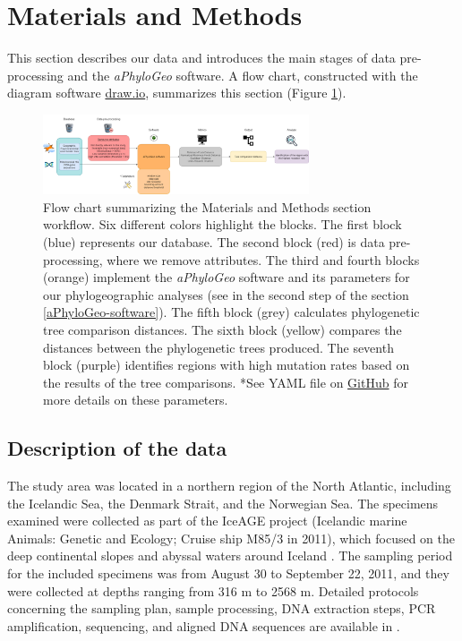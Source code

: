 \section{Materials and Methods}\label{materials-methods}
This section describes our data and introduces the main stages of data pre-processing and the \textit{aPhyloGeo} software. A flow chart, constructed with the diagram software \href{https://app.diagrams.net/}{draw.io}, summarizes this section (Figure \ref{fig:fig1}).

\begin{figure}[htbp]
    \centering
    \includegraphics[width=0.7\textwidth]{diagram.drawio.png}
    \caption{Flow chart summarizing the Materials and Methods section workflow. Six different colors highlight the blocks. The first block (blue) represents our database. The second block (red) is data pre-processing, where we remove attributes. The third and fourth blocks (orange) implement the \textit{aPhyloGeo} software and its parameters for our phylogeographic analyses (see in the second step of the section \autoref{aPhyloGeo-software}). The fifth block (grey) calculates phylogenetic tree comparison distances. The sixth block (yellow) compares the distances between the phylogenetic trees produced. The seventh block (purple) identifies regions with high mutation rates based on the results of the tree comparisons. *See YAML file on \href{https://github.com/tahiri-lab/aPhyloGeo}{GitHub} for more details on these parameters. \label{fig:fig1}}
\end{figure}

\subsection{Description of the data}
The study area was located in a northern region of the North Atlantic, including the Icelandic Sea, the Denmark Strait, and the Norwegian Sea. The specimens examined were collected as part of the IceAGE project (Icelandic marine Animals: Genetic and Ecology; Cruise ship M85/3 in 2011), which focused on the deep continental slopes and abyssal waters around Iceland \citep{meisner_prefacebiodiversity_2018}. The sampling period for the included specimens was from August 30 to September 22, 2011, and they were collected at depths ranging from 316 m to 2568 m. Detailed protocols concerning the sampling plan, sample processing, DNA extraction steps, PCR amplification, sequencing, and aligned DNA sequences are available in \citep{uhlir_adding_2021}.

